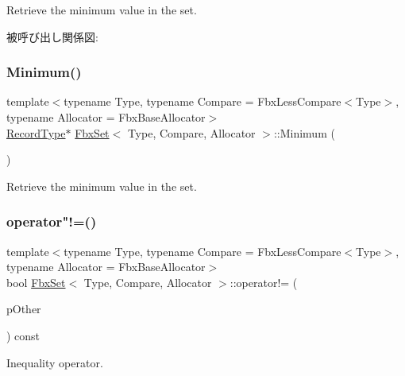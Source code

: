 Retrieve the minimum value in the set. 

被呼び出し関係図\+:
\mbox{\label{class_fbx_set_a26fc1b8f0649dc4e12ad440169260df7}} 
\subsubsection{\texorpdfstring{Minimum()}{Minimum()}\hspace{0.1cm}{\footnotesize\ttfamily [2/2]}}
{\footnotesize\ttfamily template$<$typename Type, typename Compare = Fbx\+Less\+Compare$<$\+Type$>$, typename Allocator = Fbx\+Base\+Allocator$>$ \\
\hyperlink{class_fbx_set_aa3934cd434a09288204f5e6c99b9cd01}{Record\+Type}$\ast$ \hyperlink{class_fbx_set}{Fbx\+Set}$<$ Type, Compare, Allocator $>$\+::Minimum (\begin{DoxyParamCaption}{ }\end{DoxyParamCaption})}



Retrieve the minimum value in the set. 

\mbox{\label{class_fbx_set_ab1734439d5a1bb4b4e2c6bd45b18ecd2}} 
\subsubsection{\texorpdfstring{operator"!=()}{operator!=()}}
{\footnotesize\ttfamily template$<$typename Type, typename Compare = Fbx\+Less\+Compare$<$\+Type$>$, typename Allocator = Fbx\+Base\+Allocator$>$ \\
bool \hyperlink{class_fbx_set}{Fbx\+Set}$<$ Type, Compare, Allocator $>$\+::operator!= (\begin{DoxyParamCaption}\item[{const \hyperlink{class_fbx_set}{Fbx\+Set}$<$ Type, Compare, Allocator $>$ \&}]{p\+Other }\end{DoxyParamCaption}) const}



Inequality operator. 

\mbox{\label{class_fbx_set_a69388720587c95840cc36384f33a9484}} 
